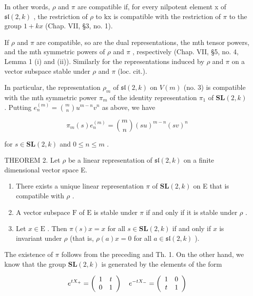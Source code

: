 In other words, \(\rho\) and \(\pi\) are compatible if, for every nilpotent element x of \(\mathfrak{sl}(2,k)\) , the restriction of \(\rho\) to kx is compatible with the restriction of \(\pi\) to the group \(1 + kx\) (Chap. VII, §3, no. 1).

If \(\rho\) and \(\pi\) are compatible, so are the dual representations, the mth tensor powers, and the mth symmetric powers of \(\rho\) and \(\pi\) , respectively (Chap. VII, §5, no. 4, Lemma 1 (i) and (ii)). Similarly for the representations induced by \(\rho\) and \(\pi\) on a vector subspace stable under \(\rho\) and \(\pi\) (loc. cit.).

In particular, the representation \(\rho_{m}\) of \(\mathfrak{sl}(2,k)\) on \(V(m)\) (no. 3) is compatible with the mth symmetric power \(\pi_{m}\) of the identity representation \(\pi_{1}\) of \(\mathbf{SL}(2,k)\) . Putting \(e_{n}^{(m)} = \binom{m}{n} u^{m-n} v^{n}\) as above, we have

\[
\pi_ {m} (s) e _ {n} ^ {(m)} = \binom {m} {n} (s u) ^ {m - n} (s v) ^ {n}\tag{3}
\]

for \(s \in \mathbf{SL}(2, k)\) and \(0 \leq n \leq m\) .

THEOREM 2. Let \(\rho\) be a linear representation of \(\mathfrak{sl}(2,k)\) on a finite dimensional vector space E.

\begin{enumerate}
\def\labelenumi{(\roman{enumi})}
\item
  There exists a unique linear representation \(\pi\) of \(\mathbf{SL}(2,k)\) on E that is compatible with \(\rho\) .
\item
  A vector subspace \(\mathrm{F}\) of \(\mathrm{E}\) is stable under \(\pi\) if and only if it is stable under \(\rho\) .
\item
  Let \(x \in \mathrm{E}\) . Then \(\pi(s)x = x\) for all \(s \in \mathbf{SL}(2,k)\) if and only if \(x\) is invariant under \(\rho\) (that is, \(\rho(a)x = 0\) for all \(a \in \mathfrak{sl}(2,k)\) ).
\end{enumerate}

The existence of \(\pi\) follows from the preceding and Th. 1. On the other hand, we know that the group \(\mathbf{SL}(2,k)\) is generated by the elements of the form

\[
e ^ {t X _ {+}} = \left( \begin{array}{c c} 1 & t \\ 0 & 1 \end{array} \right) \quad e ^ {- t X _ {-}} = \left( \begin{array}{c c} 1 & 0 \\ t & 1 \end{array} \right)
\]

